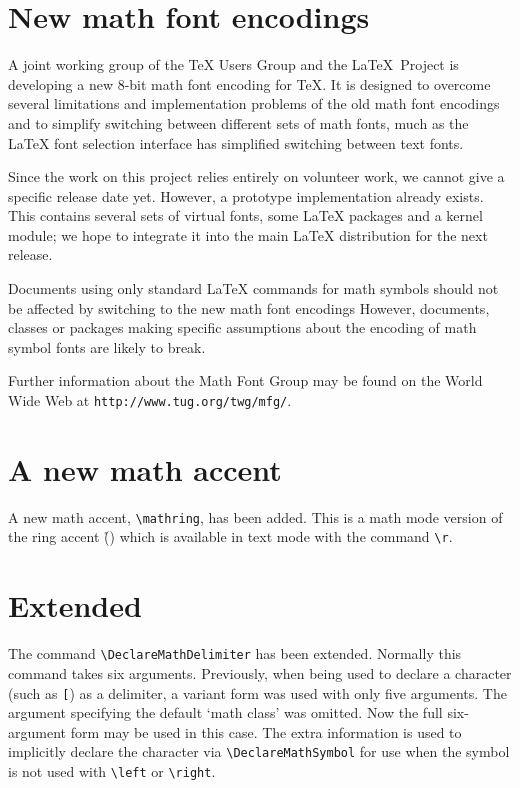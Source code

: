 \documentclass{ltnews}
\begin{document}
\maketitle


\section{New math font encodings}

A joint working group of the \TeX{} Users Group and the \LaTeX\
Project is developing a new 8-bit math font encoding for \TeX{}.
It is designed to overcome several limitations and implementation
problems of the old math font encodings and to simplify switching
between different sets of math fonts, much as the \LaTeX{} font
selection interface has simplified switching between text fonts.

Since the work on this project relies entirely on volunteer work, we
cannot give a specific release date yet.  However, a prototype
implementation already exists.  This contains several sets of virtual
fonts, some \LaTeX{} packages and a kernel module; we hope to
integrate it into the main \LaTeX{} distribution for the next
release.

Documents using only standard \LaTeX{} commands for math symbols
should not be affected by switching to the new math font encodings
However, documents, classes or packages making specific assumptions
about the encoding of math symbol fonts are likely to break.

Further information about the Math Font Group may be found on
the World Wide Web at \texttt{http://www.tug.org/twg/mfg/}.


\section{A new math accent}

A new math accent, \verb|\mathring|, has been added. This is a math mode
version of the ring accent (\r{}) which is available in text
mode with the command \verb|\r|.

\section{Extended }

The command \verb|\DeclareMathDelimiter| has been extended.
Normally this command takes six arguments. Previously, when being used
to declare a character (such as \texttt{[}) as a delimiter, a variant
form was used with only five arguments. The argument specifying the
default `math class' was omitted. Now the full six-argument form may be
used in this case. The extra information is used to implicitly declare
the character via \verb|\DeclareMathSymbol| for use when the symbol is
not used with \verb|\left| or \verb|\right|.
\end{document}
